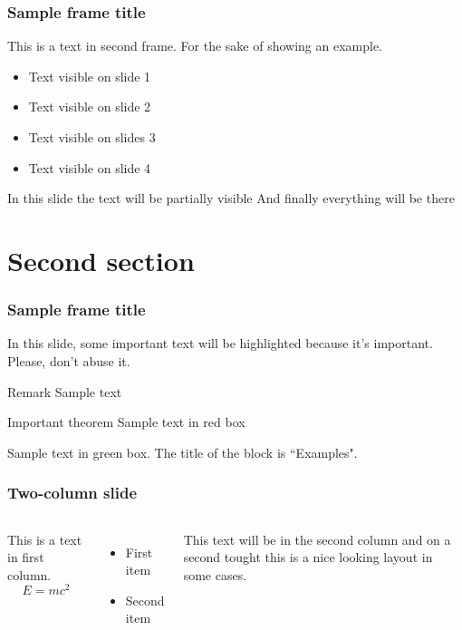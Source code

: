 \begin{frame}
	\frametitle{Sample frame title}
	This is a text in second frame. For the sake of showing an example.
	\begin{itemize}
		\item<1-> Text visible on slide 1
		\item<2-> Text visible on slide 2
		\item<3> Text visible on slides 3
		\item<4-> Text visible on slide 4
	\end{itemize}
\end{frame}
\begin{frame}
	In this slide \pause
	the text will be partially visible \pause
	And finally everything will be there
\end{frame}
\section{Second section}
\begin{frame}
\frametitle{Sample frame title}
	In this slide, some important text will be
	\alert{highlighted} because it's important.
	Please, don't abuse it.
\begin{block}{Remark}
Sample text
\end{block}

\begin{alertblock}{Important theorem}
Sample text in red box
\end{alertblock}

\begin{examples}
	Sample text in green box. The title of the block is ``Examples".
\end{examples}
\end{frame}
\begin{frame}
\frametitle{Two-column slide}
\begin{columns}
This is a text in first column.
$$E=mc^2$$
\begin{itemize}
\item First item
\item Second item
\end{itemize}

This text will be in the second column
and on a second tought this is a nice looking
layout in some cases.
\end{columns}
\end{frame}


